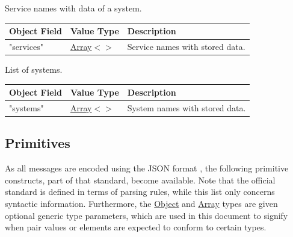 \documentclass[a4paper]{arrowhead}
\newcommand{\pref}[1]{{\textcolor{ArrowheadGrey}{\hyperref[sec:model:primitives:#1]{#1}}}}
\begin{document}

Service names with data of a system.


\noindent\begin{tabularx}{\textwidth}{| >{\raggedright\arraybackslash}p{3.9cm} | >{\raggedright\arraybackslash\small}p{5.3cm} | X |} \hline
\rowcolor{gray!33} Object Field & Value Type & Description \\ \hline
"services" & \pref{Array}$<$\allowbreak{}\pref{String}$>$ & Service names with stored data. \\ \hline
\end{tabularx}




List of systems.


\noindent\begin{tabularx}{\textwidth}{| >{\raggedright\arraybackslash}p{3.9cm} | >{\raggedright\arraybackslash\small}p{5.3cm} | X |} \hline
\rowcolor{gray!33} Object Field & Value Type & Description \\ \hline
"systems" & \pref{Array}$<$\allowbreak{}\pref{String}$>$ & System names with stored data. \\ \hline
\end{tabularx}



\subsection{Primitives}
\label{sec:model:primitives}

As all messages are encoded using the JSON format \cite{rfc8259}, the following primitive constructs, part of that standard, become available.
Note that the official standard is defined in terms of parsing rules, while this list only concerns syntactic information.
Furthermore, the \pref{Object} and \pref{Array} types are given optional generic type parameters, which are used in this document to signify when pair values or elements are expected to conform to certain types.
\end{document}
